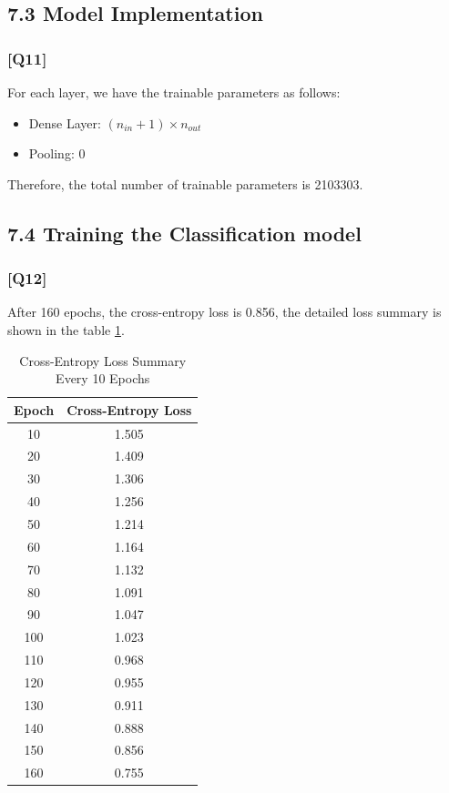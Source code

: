 \documentclass{article}
\begin{document}
\subsection*{7.3 Model Implementation}

\subsubsection*{[Q11]}

For each layer, we have the trainable parameters as follows:
\begin{itemize}
    \item Dense Layer: $(n_{in} + 1) \times n_{out}$
    \item Pooling: 0
\end{itemize}

Therefore, the total number of trainable parameters is 2103303.


\subsection*{7.4 Training the Classification model}

\subsubsection*{[Q12]}

After 160 epochs, the cross-entropy loss is 0.856, the detailed loss summary is shown in the table \ref{tab:cross_entropy_loss}.
\begin{table}[ht]
    \centering
    \caption{Cross-Entropy Loss Summary Every 10 Epochs}
    \begin{tabular}{cc}
    \toprule
    Epoch & Cross-Entropy Loss \\
    \midrule
    10  & 1.505 \\
    20  & 1.409 \\
    30  & 1.306 \\
    40  & 1.256 \\
    50  & 1.214 \\
    60  & 1.164 \\
    70  & 1.132 \\
    80  & 1.091 \\
    90  & 1.047 \\
    100 & 1.023 \\
    110 & 0.968 \\
    120 & 0.955 \\
    130 & 0.911 \\
    140 & 0.888 \\
    150 & 0.856 \\
    160 & 0.755 \\
    \bottomrule
    \end{tabular}
    \label{tab:cross_entropy_loss}
\end{table}
\end{document}
